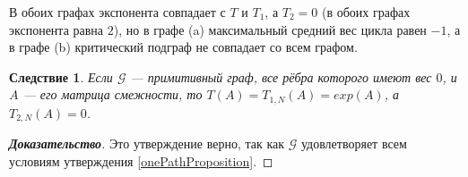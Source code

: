 \documentclass[12pt]{article}
\newtheorem{corollary}[theorem]{Следствие}
\begin{document}
\begin{figure}[h]%
    \centering
    \qquad
    \label{fig:example}%
\end{figure}

В обоих графах экспонента совпадает с $T$ и $T_1$, а $T_2 = 0$ (в обоих графах экспонента равна $2$), но в графе (a) максимальный средний вес цикла равен $-1$, а в графе (b) критический подграф не совпадает со всем графом.

\begin{corollary}
\label{corollaryTandExp}
Если $\mathcal{G}$ --- примитивный граф, все рёбра которого имеют вес $0$, и $A$ --- его матрица смежности, то $T(A) = T_{1, N}(A) = exp(A)$, а $T_{2,N}(A) = 0$.
\end{corollary}
\begin{proof}[\textbf{Доказательство}]
Это утверждение верно, так как $\mathcal{G}$ удовлетворяет всем условиям утверждения \ref{onePathProposition}.
\end{proof}
\end{document}
